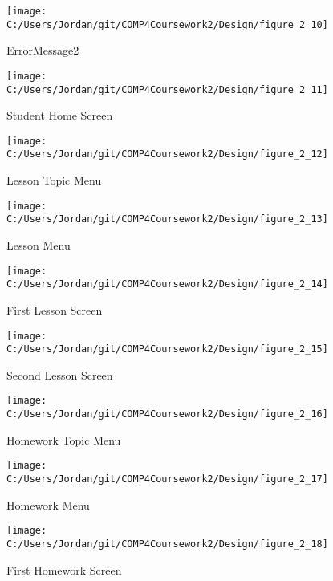 \begin{figure}[H]
    \label{fig:print_function_result}\caption{ErrorMessage2}
    \texttt{[image: C:/Users/Jordan/git/COMP4Coursework2/Design/figure\_2\_10]}
\end{figure}

\begin{figure}[H]
    \label{fig:print_function_result}\caption{Student Home Screen}
    \texttt{[image: C:/Users/Jordan/git/COMP4Coursework2/Design/figure\_2\_11]}
\end{figure}

\begin{figure}[H]
    \label{fig:print_function_result}\caption{Lesson Topic Menu}
    \texttt{[image: C:/Users/Jordan/git/COMP4Coursework2/Design/figure\_2\_12]}
\end{figure}

\begin{figure}[H]
    \label{fig:print_function_result}\caption{Lesson Menu}
    \texttt{[image: C:/Users/Jordan/git/COMP4Coursework2/Design/figure\_2\_13]}
\end{figure}

\begin{figure}[H]
    \label{fig:print_function_result}\caption{First Lesson Screen}
    \texttt{[image: C:/Users/Jordan/git/COMP4Coursework2/Design/figure\_2\_14]}
\end{figure}

\begin{figure}[H]
    \label{fig:print_function_result}\caption{Second Lesson Screen}
    \texttt{[image: C:/Users/Jordan/git/COMP4Coursework2/Design/figure\_2\_15]}
\end{figure}

\begin{figure}[H]
    \label{fig:print_function_result}\caption{Homework Topic Menu}
    \texttt{[image: C:/Users/Jordan/git/COMP4Coursework2/Design/figure\_2\_16]}
\end{figure}

\begin{figure}[H]
    \label{fig:print_function_result}\caption{Homework Menu}
    \texttt{[image: C:/Users/Jordan/git/COMP4Coursework2/Design/figure\_2\_17]}
\end{figure}

\begin{figure}[H]
    \label{fig:print_function_result}\caption{First Homework Screen}
    \texttt{[image: C:/Users/Jordan/git/COMP4Coursework2/Design/figure\_2\_18]}
\end{figure}

